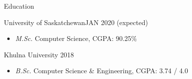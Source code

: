 \documentclass[]{mcdowellcv}
\begin{document}
	\makeheader
	
	
	
	\begin{cvsection}{Education}
		\begin{cvsubsection}{University of Saskatchewan}{}{JAN 2020 (expected)}
			\begin{itemize}
				\item \emph{M.Sc.} Computer Science, CGPA: 90.25\%
				
			\end{itemize}
		\end{cvsubsection}
		\begin{cvsubsection}{Khulna University}{}{ 2018}
			\begin{itemize}
				\item \emph{B.Sc.} Computer Science \& Engineering, CGPA: 3.74 / 4.0
				
			\end{itemize}
		\end{cvsubsection}
	\end{cvsection}
	
\end{document}
